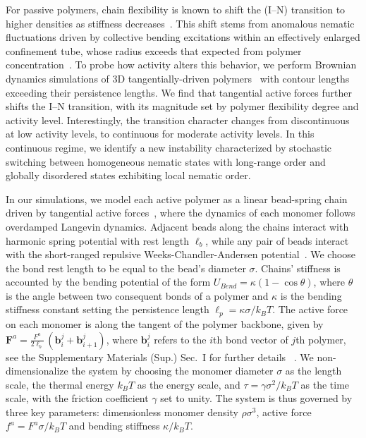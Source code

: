 \documentclass[
reprint,
superscriptaddress,
prl,









 amsmath,amssymb,
 aps,






]{revtex4-2}
\begin{document}
For passive polymers, chain flexibility is known to shift the (I--N) transition to higher densities as stiffness decreases~\cite{Binder_PRL_2016,Egorov2016}. This shift stems from anomalous nematic fluctuations driven by collective bending excitations within an effectively enlarged confinement tube, whose radius exceeds that expected from polymer concentration~\cite{Binder_PRL_2016,Egorov2016}. To probe how activity alters this behavior, we perform Brownian dynamics simulations of 3D tangentially-driven polymers~\cite{IseleHolder2015} with contour lengths exceeding their persistence lengths. We find that tangential active forces further shifts the I--N transition, with its magnitude set by polymer flexibility degree and activity level. Interestingly, the transition character changes from discontinuous at low activity levels, to continuous for moderate activity levels. In this continuous regime, we identify a new instability characterized by stochastic switching between homogeneous nematic states with long-range order and globally disordered states exhibiting local nematic order.

In our simulations, we model each active polymer as a linear bead-spring chain driven by tangential active forces~\cite{IseleHolder2015}, where the dynamics of each monomer follows overdamped Langevin dynamics. Adjacent beads along the chains interact with  harmonic spring potential with rest length $\ell_b$, while any pair of beads interact  with the short-ranged repulsive Weeks-Chandler-Andersen potential~\cite{WCA}. We choose the bond rest length to be equal to  the bead’s  diameter $\sigma$. Chains' stiffness is accounted by the bending potential of the form
$U_{Bend}=\kappa (1-\cos\theta)$, where $\theta$ is the angle between two consequent bonds of a polymer and $\kappa$ is the bending stiffness constant setting the persistence length $\ell_p= \kappa \sigma/ k_BT$. The active force on each monomer is along the tangent of the polymer backbone, given by $\boldsymbol{F}^a =\tfrac{F^a}{2\ell_b}\,(\boldsymbol{b}_{i}^j+\boldsymbol{b}_{i+1}^j)$, where $\boldsymbol{b}_{i}^j$ refers to the $i$th bond vector of $j$th polymer, see the Supplementary Materials (Sup.) Sec.~I for further details ~\cite{SM}. We non-dimensionalize the system by choosing the monomer diameter $\sigma$ as the length scale, the thermal energy $k_B T$ as the energy scale, and $\tau = \gamma \sigma^2 / k_B T$ as the time scale, with the friction coefficient $\gamma$ set to unity.
 The system is thus governed by three key  parameters:  dimensionless monomer density $\rho \sigma^3$, active force $f^{a}=F^a\sigma/k_BT$ and bending stiffness $\kappa/k_BT$.
\end{document}
